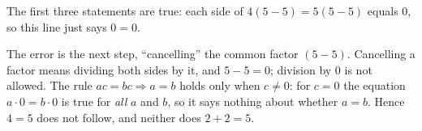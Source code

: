 The first three statements are true: each side of $4(5-5)=5(5-5)$ equals $0$, so this line just says $0=0$.

The error is the next step, ``cancelling'' the common factor $(5-5)$. Cancelling a factor means dividing both sides by it, and $5-5=0$; division by $0$ is not allowed. The rule $ac=bc\Rightarrow a=b$ holds only when $c\ne0$: for $c=0$ the equation $a\cdot0=b\cdot0$ is true for \emph{all} $a$ and $b$, so it says nothing about whether $a=b$. Hence $4=5$ does not follow, and neither does $2+2=5$.
